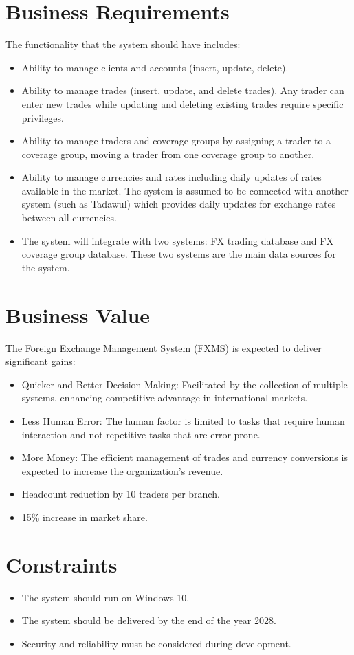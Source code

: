 \documentclass[a4paper]{report}
\begin{document}
\section{Business Requirements}
The functionality that the system should have includes:
\begin{itemize}
    \item Ability to manage clients and accounts (insert, update, delete).
    \item Ability to manage trades (insert, update, and delete trades). Any trader can enter new trades while updating and deleting existing trades require specific privileges.
    \item Ability to manage traders and coverage groups by assigning a trader to a coverage group, moving a trader from one coverage group to another.
    \item Ability to manage currencies and rates including daily updates of rates available in the market. The system is assumed to be connected with another system (such as Tadawul) which provides daily updates for exchange rates between all currencies.
    \item The system will integrate with two systems: FX trading database and FX coverage group database. These two systems are the main data sources for the system.
\end{itemize}

\section{Business Value}
The Foreign Exchange Management System (FXMS) is expected to deliver significant gains:
\begin{itemize}
    \item Quicker and Better Decision Making: Facilitated by the collection of multiple systems, enhancing competitive advantage in international markets.
    \item Less Human Error: The human factor is limited to tasks that require human interaction and not repetitive tasks that are error-prone.
    \item More Money: The efficient management of trades and currency conversions is expected to increase the organization's revenue.
    \item Headcount reduction by 10 traders per branch.
    \item 15\% increase in market share.
\end{itemize}

\section{Constraints}
\begin{itemize}
    \item The system should run on Windows 10.
    \item The system should be delivered by the end of the year 2028.
    \item Security and reliability must be considered during development.
\end{itemize}
\end{document}
